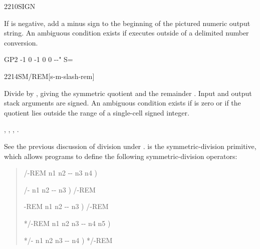 \begin{worddef}{2210}{SIGN}
\item {}

	If  is negative, add a minus sign to the beginning of
	the pictured numeric output string. An ambiguous condition exists
	if  executes outside of a  
	delimited number conversion.

	\begin{testing} %
		\ttfamily
		\word{:} GP2   -1  0  -1  0 0   -{}-" S= \word{;} \\
	\end{testing}
\end{worddef}


\begin{worddef}{2214}{SM/REM}[s-m-slash-rem]
\item {}

	Divide  by , giving the symmetric quotient
	 and the remainder . Input and output stack
	arguments are signed. An ambiguous condition exists if 
	is zero or if the quotient lies outside the range of a single-cell
	signed integer.

\see {},
	,
	,
	.

	\begin{rationale} %
		See the previous discussion of division under .
		 is the symmetric-division primitive, which allows
		programs to define the following symmetric-division operators:

		\begin{quote}\ttfamily
			\word{:} /-REM  n1 n2 -{}- n3 n4 )
				   
			\word{;}

			\word{:} /-  n1 n2 -{}- n3 )
				/-REM  
			\word{;}

			\word{:} -REM  n1 n2 -{}- n3 )
				/-REM 
			\word{;}

			\word{:} */-REM  n1 n2 n3 -{}- n4 n5 )
				   
			\word{;}

			\word{:} */-  n1 n2 n3 -{}- n4 )
				*/-REM  
			\word{;}
		\end{quote}
	\end{rationale}


\end{worddef}
